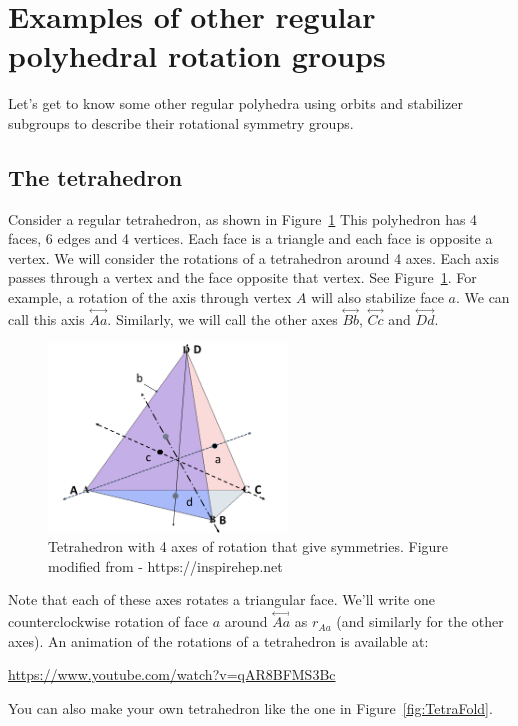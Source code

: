 \section{Examples of other regular polyhedral rotation groups}
Let's get to know some other regular polyhedra using orbits and stabilizer subgroups to describe their rotational symmetry groups.
\subsection{The tetrahedron}
Consider a regular tetrahedron, as shown in Figure~\ref {fig:TetRot} This polyhedron has 4 faces, 6 edges and 4 vertices.  Each face is a triangle and each face is opposite a vertex. We will consider the rotations of a tetrahedron around 4 axes.  Each axis passes through a vertex and the face opposite that vertex. See Figure~\ref {fig:TetRot}. For example, a rotation of the axis through vertex $A$ will also stabilize face $a$.  We can call this axis $\overset{\leftrightarrow}{Aa}$.  Similarly, we will call the other axes $\overset{\leftrightarrow}{Bb}$, $\overset{\leftrightarrow}{Cc}$ and $\overset{\leftrightarrow}{Dd}$.

\begin{figure}[ht]
\begin{center}
\includegraphics[width=2.5in]{images/TetrahedronC.png}
\caption{Tetrahedron with 4 axes of rotation that give symmetries. Figure modified  from - https://inspirehep.net}\label{fig:TetRot}
\end{center}
\end{figure}


Note that each of these axes rotates a triangular face. We'll write one counterclockwise rotation of face $a$ around $\overset{\leftrightarrow}{Aa}$ as $r_{Aa}$ (and similarly for the other axes).
An animation of the rotations of a tetrahedron is available at:

\url{https://www.youtube.com/watch?v=qAR8BFMS3Bc}

You can also make your own tetrahedron like the one in Figure~\ref{fig:TetraFold}.

